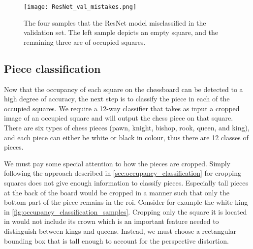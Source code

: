 \documentclass[../main.tex]{subfiles}
\begin{document}
\begin{figure}
    \texttt{[image: ResNet\_val\_mistakes.png]}
    \caption[The four samples that the ResNet model misclassified in the validation set.]{The four samples that the ResNet model misclassified in the validation set. The left sample depicts an empty square, and the remaining three are of occupied squares.}
    \label{fig:occupancy_resnet_mistakes}
\end{figure}

\subsection{Piece classification}
Now that the occupancy of each square on the chessboard can be detected to a high degree of accuracy, the next step is to classify the piece in each of the occupied squares.
We require a 12-way classifier that takes as input a cropped image of an occupied square and will output the chess piece on that square. 
There are six types of chess pieces (pawn, knight, bishop, rook, queen, and king), and each piece can either be white or black in colour, thus there are 12 classes of pieces.

We must pay some special attention to how the pieces are cropped. 
Simply following the approach described in \cref{sec:occupancy_classification} for cropping squares does not give enough information to classify pieces.
Especially tall pieces at the back of the board would be cropped in a manner such that only the bottom part of the piece remains in the \gls{roi}. 
Consider for example the white king in \cref{fig:occupancy_classification_samples}.
Cropping only the square it is located in would not include its crown which is an important feature needed to distinguish between kings and queens.
Instead, we must choose a rectangular bounding box that is tall enough to account for the perspective distortion.
\end{document}
